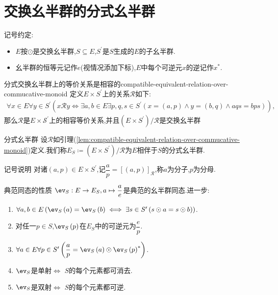 \section{交换幺半群的分式幺半群}

记号约定:
\begin{itemize}
	\item $E$按$\odot$是交换幺半群,$S\subseteq E$,$S^{\prime}$是$S$生成的$E$的子幺半群.
	\item 幺半群的恒等元记作$e$(视情况添加下标),$E$中每个可逆元$x$的逆记作$x^{\ast}$.
\end{itemize}

\begin{lemma}{分式交换幺半群上的等价关系是相容的}{compatible-equivalent-relation-over-commucative-monoid}
	定义$E\times S^{\prime}$上的关系$\mathcal{R}$如下:
	\begin{align*}
		\forall x\in E\forall y\in S^{\prime}\left(x\mathcal{R}y\iff\exists a,b\in E\exists p,q,s\in S^{\prime}\left(x=\left(a,p\right)\wedge y=\left(b,q\right)\wedge aqs=bps\right)\right),
	\end{align*}
	那么$\mathcal{R}$是$E\times\mathcal{S}^{\prime}$上的相容等价关系,并且$\left(E\times S^{\prime}\right)/\mathcal{R}$是交换幺半群
\end{lemma}

\begin{definition}{分式幺半群}{}
	设$\mathcal{R}$如引理(\ref{lem:compatible-equivalent-relation-over-commucative-monoid})定义.我们称$E_{S}\coloneq\left(E\times S^{\prime}\right)/\mathcal{R}$为$E$相伴于$S$的分式幺半群.
\end{definition}

\begin{remark}{记号说明}{}
	对诸$\left(a,p\right)\in E\times S^{\prime}$,记$\dfrac{a}{p}=\left[\left(a,p\right)\right]_{\mathcal{R}}$,称$a$为分子,$p$为分母.
\end{remark}

\begin{proposition}{典范同态的性质}{}
	$\ev_{S}:E\to E_{S},a\mapsto\dfrac{a}{e}$是典范的幺半群同态.进一步:
	\begin{enumerate}
		\item$\forall a,b\in E\left(\ev_{S}\left(a\right)=\ev_{S}\left(b\right)\iff\exists s\in S^{\prime}\left(s\odot a=s\odot b\right)\right)$.
		\item 对任一$p\in S$,$\ev_{S}\left(p\right)$在$E_{S}$中的可逆元为$\dfrac{e}{p}$.
		\item $\forall a\in E\forall p\in S^{\prime}\left(\dfrac{a}{p}=\ev_{S}\left(a\right)\odot\ev_{S}\left(p\right)^{\ast}\right)$.
		\item $\ev_{S}$是单射$\iff$ $S$的每个元素都可消去.
		\item $\ev_{S}$是双射$\iff$ $S$的每个元素都可逆.
	\end{enumerate}
\end{proposition}

